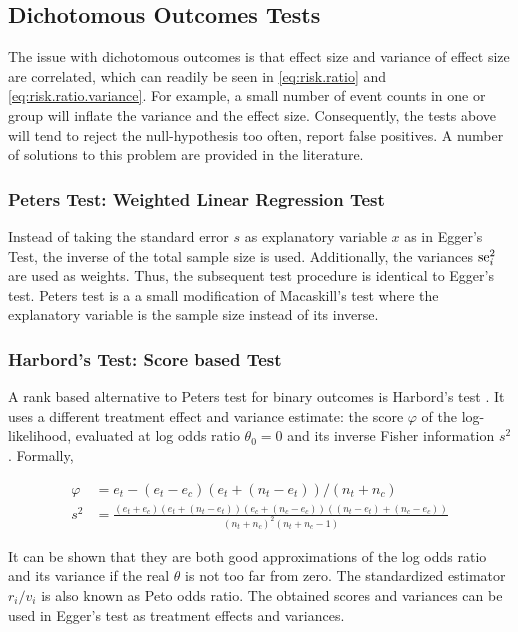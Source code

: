 \documentclass[11pt,a4paper,twoside]{book}\usepackage[]{graphicx}\usepackage[]{color}
\begin{document}
\subsection{Dichotomous Outcomes Tests}
 
The issue with dichotomous outcomes is that effect size and variance of effect size are correlated, which can readily be seen in \eqref{eq:risk.ratio} and \eqref{eq:risk.ratio.variance}. For example, a small number of event counts in one or group will inflate the variance and the effect size. Consequently, the tests above will tend to reject the null-hypothesis too often, \ie report false positives. A number of solutions to this problem are provided in the literature.


\subsubsection{Peters Test: Weighted Linear Regression Test} \label{sec:Peter}
Instead of taking the standard error $s$ as explanatory variable $x$ as in Egger's Test, the inverse of the total sample size is used. Additionally, the variances $\operatorname{se}_i^2$ are used as weights. Thus, the subsequent test procedure is identical to Egger's test. Peters test is a a small modification of Macaskill's test where the explanatory variable is the sample size instead of its inverse.


\subsubsection{Harbord's Test: Score based Test} \label{sec:Harbord}
A rank based alternative to Peters test for binary outcomes is Harbord's test \citep{Harbord}.
It uses a different treatment effect and variance estimate: the score $\varphi$ of the log-likelihood, evaluated at log odds ratio $\theta_0 = 0$ and its inverse Fisher information $s^2$. Formally,

\begin{align}
\varphi &= e_t - (e_t - e_c)(e_t + (n_t - e_t))/(n_t + n_c) \label{harbord.score} \\
 s^2 &= \frac{(e_t + e_c)(e_t + (n_t - e_t))(e_c + (n_c - e_c))((n_t - e_t) + (n_c - e_c))}{(n_t + n_c)^2(n_t + n_c - 1)} \label{harbord.variance}
\end{align}

It can be shown that they are both good approximations of the log odds ratio and its variance if the real $\theta$ is not too far from zero. The standardized estimator $r_i/v_i$ is also known as Peto odds ratio. The obtained scores and variances can be used in Egger's test as treatment effects and variances.
\end{document}
